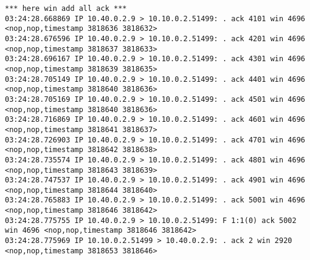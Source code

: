 \documentclass[a4paper,12pt]{article}
\begin{document}
\begin{lstlisting}
*** here win add all ack ***
03:24:28.668869 IP 10.40.0.2.9 > 10.10.0.2.51499: . ack 4101 win 4696 <nop,nop,timestamp 3818636 3818632>
03:24:28.676596 IP 10.40.0.2.9 > 10.10.0.2.51499: . ack 4201 win 4696 <nop,nop,timestamp 3818637 3818633>
03:24:28.696167 IP 10.40.0.2.9 > 10.10.0.2.51499: . ack 4301 win 4696 <nop,nop,timestamp 3818639 3818635>
03:24:28.705149 IP 10.40.0.2.9 > 10.10.0.2.51499: . ack 4401 win 4696 <nop,nop,timestamp 3818640 3818636>
03:24:28.705169 IP 10.40.0.2.9 > 10.10.0.2.51499: . ack 4501 win 4696 <nop,nop,timestamp 3818640 3818636>
03:24:28.716869 IP 10.40.0.2.9 > 10.10.0.2.51499: . ack 4601 win 4696 <nop,nop,timestamp 3818641 3818637>
03:24:28.726903 IP 10.40.0.2.9 > 10.10.0.2.51499: . ack 4701 win 4696 <nop,nop,timestamp 3818642 3818638>
03:24:28.735574 IP 10.40.0.2.9 > 10.10.0.2.51499: . ack 4801 win 4696 <nop,nop,timestamp 3818643 3818639>
03:24:28.747537 IP 10.40.0.2.9 > 10.10.0.2.51499: . ack 4901 win 4696 <nop,nop,timestamp 3818644 3818640>
03:24:28.765883 IP 10.40.0.2.9 > 10.10.0.2.51499: . ack 5001 win 4696 <nop,nop,timestamp 3818646 3818642>
03:24:28.775755 IP 10.40.0.2.9 > 10.10.0.2.51499: F 1:1(0) ack 5002 win 4696 <nop,nop,timestamp 3818646 3818642>
03:24:28.775969 IP 10.10.0.2.51499 > 10.40.0.2.9: . ack 2 win 2920 <nop,nop,timestamp 3818653 3818646>


\end{lstlisting}
\end{document}
